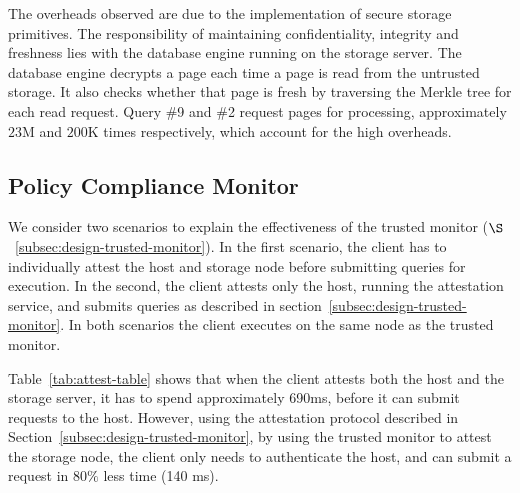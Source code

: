 The overheads observed are due to the implementation of secure storage primitives. The responsibility of maintaining confidentiality, integrity and freshness lies with the database engine running on the storage server. The database engine decrypts a page each time a page is read from the untrusted storage. It also checks whether that page is fresh by traversing the Merkle tree for each read request. Query \#9 and \#2 request pages for processing, approximately $23$M and $200$K times respectively, which account for the high overheads.

\subsection{Policy Compliance Monitor}
\label{subsec:monitor-eval}

% 

We consider two scenarios to explain the effectiveness of the trusted monitor ($\S$~\ref{subsec:design-trusted-monitor}). In the first scenario, the client has to individually attest the host and storage node before submitting queries for execution. In the second, the client attests only the host, running the attestation service, and submits queries as described in section~\ref{subsec:design-trusted-monitor}. In both scenarios the client executes on the same node as the trusted monitor.


 Table~\ref{tab:attest-table} shows that when the client attests both the host and the storage server, it has to spend approximately 690ms, before it can submit requests to the host. However, using the attestation protocol described in Section~\ref{subsec:design-trusted-monitor}, by using the trusted monitor to attest the storage node, the client only needs to authenticate the host, and can submit a request in 80$\%$ less time (140 ms).



